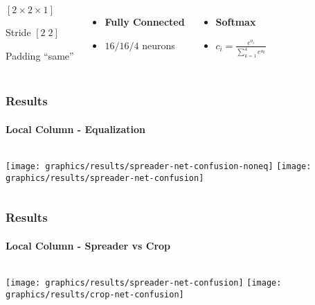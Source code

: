 \begin{frame}
\begin{columns}
{\begin{itemize}
{                        \item $\left[2\times 2\times 1\right]$
                        \item Stride $\left[2\;2\right]$
                        \item Padding ``same''
                    }
                \end{itemize}
            }
             {
                \begin{itemize}
                    \item \textbf{Fully Connected}
                    \item $16/16/4$ neurons
                \end{itemize}
            }
             {
                \begin{itemize}
                    \item \textbf{Softmax}
                    \item $c_i = \frac{e^{o_i}}{\sum_{k = 1}^4 e^{o_k}}$
                \end{itemize}
            }
    \end{columns}
\end{frame}

\begin{frame}
    \frametitle{Results}
    \framesubtitle{Local Column - Equalization}
    \centering
    \begin{columns}
             {
                \texttt{[image: graphics/results/spreader-net-confusion-noneq]}
            }
             {
                \texttt{[image: graphics/results/spreader-net-confusion]}
            }
    \end{columns}
\end{frame}

\begin{frame}
    \frametitle{Results}
    \framesubtitle{Local Column - Spreader vs Crop}
    \centering
    \begin{columns}
             {
                \texttt{[image: graphics/results/spreader-net-confusion]}
            }
             {
                \texttt{[image: graphics/results/crop-net-confusion]}
            }
    \end{columns}
\end{frame}

